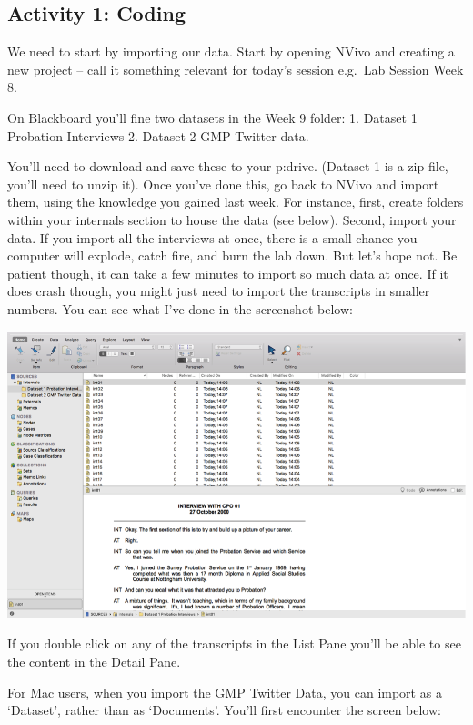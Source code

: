 \documentclass[]{book}
\theoremstyle{definition}
\theoremstyle{definition}
\theoremstyle{definition}
\theoremstyle{remark}
\begin{document}
\hypertarget{activity-1-coding}{%
\subsection{Activity 1: Coding}\label{activity-1-coding}}

We need to start by importing our data. Start by opening NVivo and
creating a new project -- call it something relevant for today's session
e.g.~Lab Session Week 8.

On Blackboard you'll fine two datasets in the Week 9 folder: 1. Dataset
1 Probation Interviews 2. Dataset 2 GMP Twitter data.

You'll need to download and save these to your p:drive. (Dataset 1 is a
zip file, you'll need to unzip it). Once you've done this, go back to
NVivo and import them, using the knowledge you gained last week. For
instance, first, create folders within your internals section to house
the data (see below). Second, import your data. If you import all the
interviews at once, there is a small chance you computer will explode,
catch fire, and burn the lab down. But let's hope not. Be patient
though, it can take a few minutes to import so much data at once. If it
does crash though, you might just need to import the transcripts in
smaller numbers. You can see what I've done in the screenshot below:

\includegraphics{imgs/qual_32.png}

If you double click on any of the transcripts in the List Pane you'll be
able to see the content in the Detail Pane.

For Mac users, when you import the GMP Twitter Data, you can import as a
`Dataset', rather than as `Documents'. You'll first encounter the screen
below:
\end{document}
